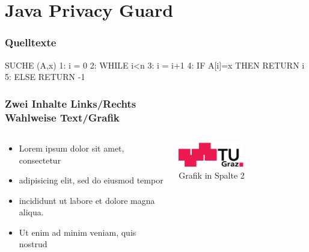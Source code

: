 \documentclass{beamer}
\begin{document}

\section{Java Privacy Guard}

\begin{frame}[fragile]
	\frametitle{Quelltexte}
	\begin{spacing}{1}
	\begin{semiverbatim}
SUCHE (A,x)
1: i = 0
2: WHILE i<n
3:     i = i+1
4:     \alert{IF A[i]=x THEN RETURN i}
5: ELSE RETURN -1
	\end{semiverbatim}
	\end{spacing}
\end{frame}



\begin{frame}
	\frametitle{Zwei Inhalte Links/Rechts\\Wahlweise Text/Grafik}
	\begin{columns}[onlytextwidth]
		\begin{column}{0.5\textwidth}
			\begin{itemize}
				\item Lorem ipsum dolor sit amet, consectetur 
				\item adipisicing elit, sed do eiusmod tempor 
				\item incididunt ut labore et dolore magna aliqua. 
				\item Ut enim ad minim veniam, quis nostrud 
			\end{itemize}
		\end{column}
		\begin{column}{0.5\textwidth}
			\begin{center}
			\includegraphics[width=0.5\textwidth]{logo.pdf}\\
			Grafik in Spalte 2
			\end{center}
		\end{column}
	\end{columns}
\end{frame}
\end{document}
